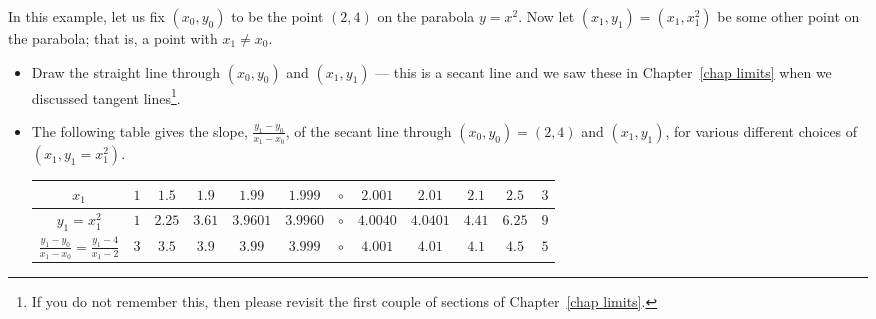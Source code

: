 \begin{eg}\label{eg:DIFFslopeA}
In this example, let us fix $(x_0,y_0)$ to be the point $(2,4)$
on the parabola $y=x^2$. Now let $(x_1, y_1) = (x_1, x_1^2)$ be some other
point on the parabola; that is, a point with $x_1 \neq x_0$.

\begin{itemize}
\item Draw the straight line through $(x_0,y_0)$ and $(x_1,y_1)$ --- this is a secant
line and we saw these in Chapter~\ref{chap limits} when we discussed tangent
lines\footnote{If you do not remember this, then please revisit the first couple of
sections of Chapter~\ref{chap limits}.}.

\item The following table gives the slope, $\tfrac{y_1-y_0}{x_1-x_0}$, of the secant line
through $(x_0,y_0)=(2,4)$ and $(x_1,y_1)$, for various different choices of
$(x_1,y_1=x_1^2)$.

\renewcommand{\arraystretch}{1.3}
\begin{center}
     \begin{tabular}{|c||c|c|c|c|c|c|c|c|c|c|c|}
          \hline
          $x_1$ &
              $1$ & $1.5$ & $1.9$ & $1.99$ & $1.999$ & $\circ$
                                & $2.001$ & $2.01$
                                & $2.1$ & $2.5$ & $3$ \\ \hline
          $y_1=x_1^2$ &
             $1$ & $2.25$ & $3.61$ & $3.9601$ & $3.9960$ & $\circ$
                                & $4.0040$ & $4.0401$
                                & $4.41$ & $6.25$ & $9$ \\ \hline
          $\tfrac{y_1-y_0}{x_1-x_0}=\tfrac{y_1-4}{x_1-2}\!$ &
              $3$ & $3.5$ & $3.9$ & $3.99$ & $3.999$ & $\circ$
                                & $4.001$ & $4.01$
                                & $4.1$ & $4.5$ & $5$ \\ \hline
     \end{tabular}
\end{center}
\renewcommand{\arraystretch}{1.0}


\end{itemize}
\end{eg}
